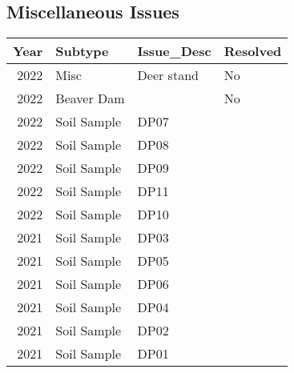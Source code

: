 \documentclass[
  landscape]{article}
\begin{document}
\hypertarget{miscellaneous-issues}{%
\subsection{Miscellaneous Issues}\label{miscellaneous-issues}}

\begin{longtable}[]{@{}rlll@{}}
\toprule()
Year & Subtype & Issue\_Desc & Resolved \\
\midrule()
\endhead
2022 & Misc & Deer stand & No \\
2022 & Beaver Dam & & No \\
2022 & Soil Sample & DP07 & \\
2022 & Soil Sample & DP08 & \\
2022 & Soil Sample & DP09 & \\
2022 & Soil Sample & DP11 & \\
2022 & Soil Sample & DP10 & \\
2021 & Soil Sample & DP03 & \\
2021 & Soil Sample & DP05 & \\
2021 & Soil Sample & DP06 & \\
2021 & Soil Sample & DP04 & \\
2021 & Soil Sample & DP02 & \\
2021 & Soil Sample & DP01 & \\
\bottomrule()
\end{longtable}
\end{document}
